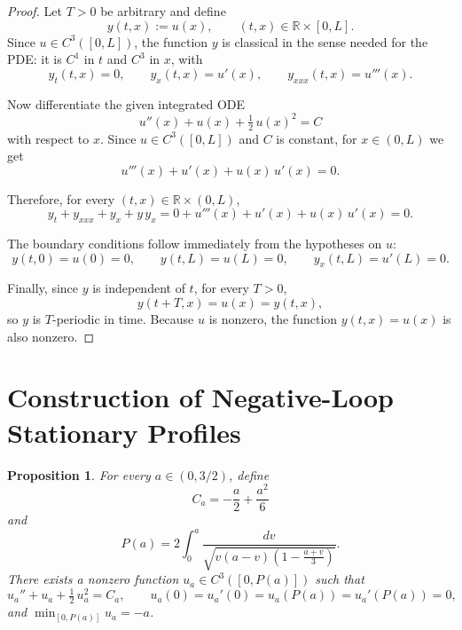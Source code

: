 \documentclass{article}
\newtheorem{proposition}[lemma]{Proposition}
\begin{document}
\begin{proof}
Let $T > 0$ be arbitrary and define
\[
y(t,x) := u(x), \qquad (t,x) \in \mathbb{R} \times [0,L].
\]
Since $u \in C^3([0,L])$, the function $y$ is classical in the sense needed for the PDE: it is $C^1$ in $t$ and $C^3$ in $x$, with
\[
y_t(t,x) = 0, \qquad y_x(t,x) = u'(x), \qquad y_{xxx}(t,x) = u'''(x).
\]

Now differentiate the given integrated ODE
\[
u''(x) + u(x) + \tfrac{1}{2}\,u(x)^2 = C
\]
with respect to $x$. Since $u \in C^3([0,L])$ and $C$ is constant, for $x \in (0,L)$ we get
\[
u'''(x) + u'(x) + u(x)\,u'(x) = 0.
\]

Therefore, for every $(t,x) \in \mathbb{R} \times (0,L)$,
\[
y_t + y_{xxx} + y_x + y\,y_x = 0 + u'''(x) + u'(x) + u(x)\,u'(x) = 0.
\]

The boundary conditions follow immediately from the hypotheses on $u$:
\[
y(t,0) = u(0) = 0, \qquad y(t,L) = u(L) = 0, \qquad y_x(t,L) = u'(L) = 0.
\]

Finally, since $y$ is independent of $t$, for every $T > 0$,
\[
y(t+T, x) = u(x) = y(t,x),
\]
so $y$ is $T$-periodic in time. Because $u$ is nonzero, the function $y(t,x) = u(x)$ is also nonzero.
\end{proof}

\section{Construction of Negative-Loop Stationary Profiles}

\begin{proposition}\label{prop:negative-loop}
For every $a \in (0, 3/2)$, define
\[
C_a = -\frac{a}{2} + \frac{a^2}{6}
\]
and
\[
P(a) = 2\int_0^a \frac{dv}{\sqrt{v(a-v)\!\left(1 - \frac{a+v}{3}\right)}}.
\]
There exists a nonzero function $u_a \in C^3([0, P(a)])$ such that
\[
u_a'' + u_a + \tfrac{1}{2}\,u_a^2 = C_a, \qquad u_a(0) = u_a'(0) = u_a(P(a)) = u_a'(P(a)) = 0,
\]
and $\min_{[0,P(a)]} u_a = -a$.
\end{proposition}
\end{document}
